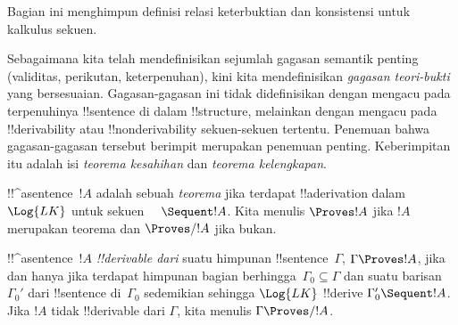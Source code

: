 \documentclass[../../../include/open-logic-section]{subfiles}
\begin{document}
\begin{editorial}
  Bagian ini menghimpun definisi relasi keterbuktian dan konsistensi
  untuk kalkulus sekuen.
\end{editorial}

      {}
      {}


\begin{explain}
Sebagaimana kita telah mendefinisikan sejumlah gagasan semantik penting
(validitas, perikutan, keterpenuhan), kini kita mendefinisikan
\emph{gagasan teori-bukti} yang bersesuaian. Gagasan-gagasan ini tidak
didefinisikan dengan mengacu pada terpenuhinya !!{sentence} di dalam
!!{structure}, melainkan dengan mengacu pada !!{derivability} atau
!!{nonderivability} sekuen-sekuen tertentu. Penemuan bahwa gagasan-gagasan
tersebut berimpit merupakan penemuan penting. Keberimpitan itu adalah isi
\emph{teorema kesahihan} dan \emph{teorema kelengkapan}.
\end{explain}

\begin{defn}[Teorema]
!!^a{sentence}~$!A$ adalah sebuah \emph{teorema} jika terdapat
!!a{derivation} dalam~$\Log{LK}$ untuk sekuen $\quad \Sequent !A$.
Kita menulis $\Proves !A$ jika $!A$ merupakan teorema dan
$\Proves/ !A$ jika bukan.
\end{defn}

\begin{defn}[!!^{derivability}]
!!^a{sentence}~$!A$ \emph{!!{derivable} dari} suatu himpunan
!!{sentence}~$\Gamma$, $\Gamma \Proves !A$, jika dan hanya jika terdapat
himpunan bagian berhingga~$\Gamma_0 \subseteq \Gamma$ dan suatu barisan
$\Gamma_0'$ dari !!{sentence} di~$\Gamma_0$ sedemikian sehingga
$\Log{LK}$ !!{derive} $\Gamma_0' \Sequent !A$. Jika $!A$ tidak
!!{derivable} dari $\Gamma$, kita menulis $\Gamma \Proves/ !A$.
\end{defn}
\end{document}
